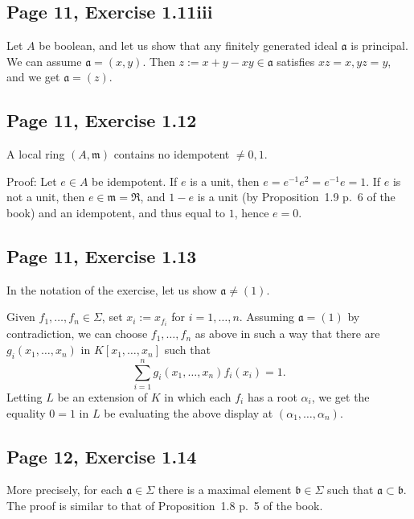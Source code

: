 \documentclass[parskip=half,fontsize=12pt]{scrartcl}%
\newcommand{\mf}{\mathfrak}
\newcommand{\aaa}{\mf a}
\newcommand{\bbb}{\mf b}
\newcommand{\mmm}{\mf m}
\begin{document}
\subsection{Page 11, Exercise 1.11iii}\label{1.11iii}%

Let $A$ be boolean, and let us show that any finitely generated ideal $\aaa$ is principal. We can assume $\aaa=(x,y)$. Then $z:=x+y-xy\in\aaa$ satisfies $xz=x,yz=y$, and we get $\aaa=(z)$.

\subsection{Page 11, Exercise 1.12}\label{112}%

A local ring $(A,\mmm)$ contains no idempotent $\neq0,1$. %

Proof: Let $e\in A$ be idempotent. If $e$ is a unit, then $e=e^{-1}e^2=e^{-1}e=1$. If $e$ is not a unit, then $e\in\mmm=\mf R$, and $1-e$ is a unit (by Proposition~1.9 p.~6 of the book) and an idempotent, and thus equal to $1$, hence $e=0$.

\subsection{Page 11, Exercise 1.13}%

In the notation of the exercise, let us show $\aaa\neq(1)$. 

Given $f_1,\dots,f_n\in\Sigma$, set $x_i:=x_{f_i}$ for $i=1,\dots,n$. Assuming $\aaa=(1)$ by contradiction, we can choose $f_1,\dots,f_n$ as above in such a way that there are $g_i(x_1,\dots,x_n)$ in $K[x_1,\dots,x_n]$ such that 
$$
\sum_{i=1}^n g_i(x_1,\dots,x_n)f_i(x_i)=1.
$$ 
Letting $L$ be an extension of $K$ in which each $f_i$ has a root $\alpha_i$, we get the equality $0=1$ in $L$ be evaluating the above display at $(\alpha_1,\dots,\alpha_n)$.

\subsection{Page 12, Exercise 1.14}\label{114}%

More precisely, for each $\mf a\in\Sigma$ there is a maximal element $\bbb\in\Sigma$ such that $\mf a\subset\bbb$. The proof is similar to that of Proposition~1.8 p.~5 of the book.
\end{document}
